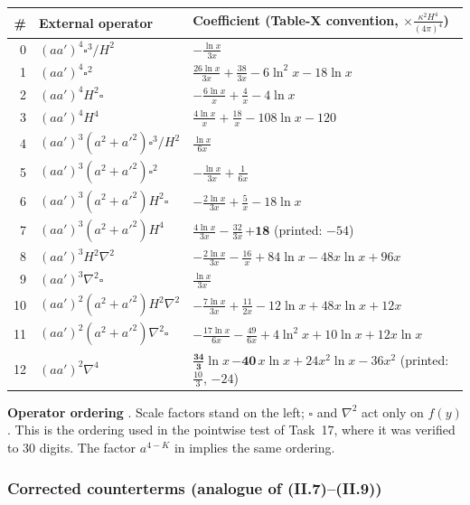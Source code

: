 {\small\renewcommand{\arraystretch}{1.3}
\begin{longtable}{@{}r l p{}@{}}
\toprule
\# & External operator & Coefficient (Table-X convention, $\times\frac{\kappa^2H^4}{(4\pi)^4}$)\\
\midrule
\endhead
0 & $(aa')^4\square^3/H^2$ & $-\frac{\ln x}{3x}$\\
1 & $(aa')^4\square^2$ & $\frac{26\ln x}{3x}+\frac{38}{3x}-6\ln^2x-18\ln x$\\
2 & $(aa')^4H^2\square$ & $-\frac{6\ln x}{x}+\frac4x-4\ln x$\\
3 & $(aa')^4H^4$ & $\frac{4\ln x}{x}+\frac{18}x-108\ln x-120$\\
4 & $(aa')^3(a^2+a'^2)\square^3/H^2$ & $\frac{\ln x}{6x}$\\
5 & $(aa')^3(a^2+a'^2)\square^2$ & $-\frac{\ln x}{3x}+\frac1{6x}$\\
6 & $(aa')^3(a^2+a'^2)H^2\square$ & $-\frac{2\ln x}{3x}+\frac5x-18\ln x$\\
7 & $(aa')^3(a^2+a'^2)H^4$ & $\frac{4\ln x}{3x}-\frac{32}{3x}\,\bm{+18}$ \quad(printed: $-54$)\\
8 & $(aa')^3H^2\nabla^2$ & $-\frac{2\ln x}{3x}-\frac{16}x+84\ln x-48x\ln x+96x$\\
9 & $(aa')^3\nabla^2\square$ & $\frac{\ln x}{3x}$\\
10 & $(aa')^2(a^2+a'^2)H^2\nabla^2$ & $-\frac{7\ln x}{3x}+\frac{11}{2x}-12\ln x+48x\ln x+12x$\\
11 & $(aa')^2(a^2+a'^2)\nabla^2\square$ & $-\frac{17\ln x}{6x}-\frac{49}{6x}+4\ln^2x+10\ln x+12x\ln x$\\
12 & $(aa')^2\nabla^4$ & $\bm{\frac{34}3}\ln x\,\bm{-40}\,x\ln x+24x^2\ln x-36x^2$ \quad(printed: $\frac{10}3$, $-24$)\\
\bottomrule
\end{longtable}
}

\noindent\textbf{Operator ordering} \tA. Scale factors stand on the left; $\square$ and $\nabla^2$ act only on $f(y)$.
This is the ordering used in the pointwise test of Task~17, where it was verified to 30 digits. The factor $a^{4-K}$ in  implies the same ordering.

\subsubsection{Corrected counterterms (analogue of (II.7)--(II.9))}

